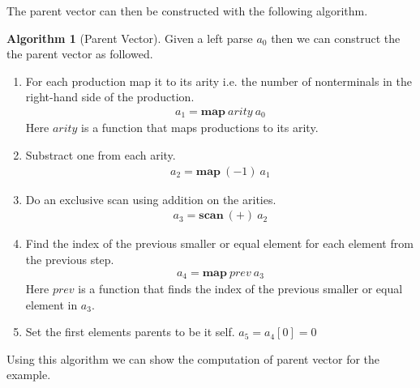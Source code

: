 \documentclass[a4paper,12pt]{article}
\theoremstyle{definition}
\newtheorem{algorithm}{Algorithm}[section]
\begin{document}
The parent vector can then be constructed with the following algorithm.
\begin{algorithm}[Parent Vector]\label{algo:parent}
  Given a left parse $a_0$ then we can construct the the parent vector as followed.
  \begin{enumerate}
    \item For each production map it to its arity i.e. the number of nonterminals in the right-hand side of the production.
    \begin{align*}
      a_1 = \mathbf{map} \: arity \: a_0
    \end{align*}
    Here $arity$ is a function that maps productions to its arity.
    \item Substract one from each arity.
    \begin{align*}
      a_2 = \mathbf{map} \: (-1) \: a_1
    \end{align*}
    \item Do an exclusive scan using addition on the arities.
    \begin{align*}
      a_3 = \mathbf{scan} \: (+) \: a_2
    \end{align*}
    \item Find the index of the previous smaller or equal element for each element from the previous step. 
    \begin{align*}
      a_4 = \mathbf{map} \: prev \: a_3
    \end{align*}
    Here $prev$ is a function that finds the index of the previous smaller or equal element in $a_3$.
    \item Set the first elements parents to be it self. $a_5 = a_4[0] = 0$
  \end{enumerate}
\end{algorithm}
Using this algorithm we can show the computation of parent vector for the example.
\end{document}
